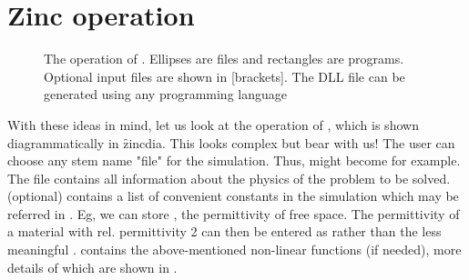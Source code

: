 \documentclass[a4paper,twoside,11pt]{book}
\begin{document}
\section{Zinc operation}

\begin{figure}
  \caption{The operation of \zinc. Ellipses are files and rectangles
    are programs. Optional input files are shown in [brackets]. The
    DLL file can be generated using any programming language}
  \label{zincdia}
\end{figure}

With these ideas in mind, let us look at the operation of \zinc, which
is shown diagrammatically in \f{zincdia}. This looks complex but bear
with us!  The user can choose any stem name "file" for the
simulation. Thus,  might become
 for example. The  file
contains all information about the physics of the problem to be
solved.   (optional) contains a list of convenient
constants in the simulation which may be referred in
. Eg, we can store , the
permittivity of free space. The permittivity of a material with
rel. permittivity 2 can then be entered as  rather than
the less meaningful . 
contains the above-mentioned non-linear functions (if needed), more
details of which are shown in . 
\end{document}
